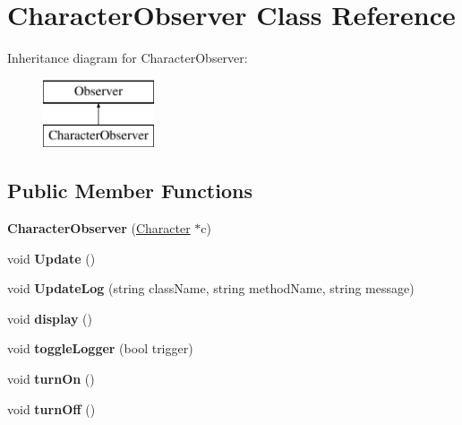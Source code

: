 \hypertarget{class_character_observer}{}\section{Character\+Observer Class Reference}
\label{class_character_observer}
Inheritance diagram for Character\+Observer\+:\begin{figure}[H]
\begin{center}
\leavevmode
\includegraphics[height=2.000000cm]{class_character_observer}
\end{center}
\end{figure}
\subsection*{Public Member Functions}
\begin{DoxyCompactItemize}
\item 
\hypertarget{class_character_observer_a6a215cb4cdb72aabc0ad95b8b7c0373c}{}\label{class_character_observer_a6a215cb4cdb72aabc0ad95b8b7c0373c} 
{\bfseries Character\+Observer} (\hyperlink{class_character}{Character} $\ast$c)
\item 
\hypertarget{class_character_observer_a398d6d784065c7ed36c928d44a574630}{}\label{class_character_observer_a398d6d784065c7ed36c928d44a574630} 
void {\bfseries Update} ()
\item 
\hypertarget{class_character_observer_a5ef9f9d1586716787f779fb891b6ad5a}{}\label{class_character_observer_a5ef9f9d1586716787f779fb891b6ad5a} 
void {\bfseries Update\+Log} (string class\+Name, string method\+Name, string message)
\item 
\hypertarget{class_character_observer_af255a3fd431b55de8dd2ab9a639e546b}{}\label{class_character_observer_af255a3fd431b55de8dd2ab9a639e546b} 
void {\bfseries display} ()
\item 
\hypertarget{class_character_observer_af801c6169ef1342c14accd4ac39476f5}{}\label{class_character_observer_af801c6169ef1342c14accd4ac39476f5} 
void {\bfseries toggle\+Logger} (bool trigger)
\item 
\hypertarget{class_character_observer_a910eec34d769bb49ac5839683b09d5d8}{}\label{class_character_observer_a910eec34d769bb49ac5839683b09d5d8} 
void {\bfseries turn\+On} ()
\item 
\hypertarget{class_character_observer_a991783127f3b76eacb8ec6a564dd2a2a}{}\label{class_character_observer_a991783127f3b76eacb8ec6a564dd2a2a} 
void {\bfseries turn\+Off} ()
\end{DoxyCompactItemize}
